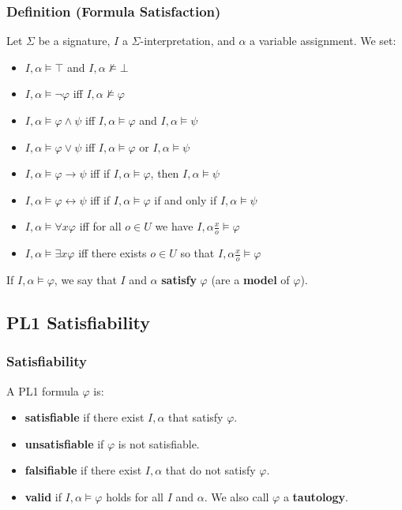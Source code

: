 \documentclass[conference, a4paper]{styles/acmsiggraph}
\begin{document}
        \subsubsection{Definition (Formula Satisfaction)}
            Let $\Sigma$ be a signature, $I$ a $\Sigma$-interpretation, and $\alpha$ a variable assignment. We set:
                \begin{itemize}
                    \item $I, \alpha \vDash \top$ and $I, \alpha \nvDash \bot$
                    \item $I, \alpha \vDash \lnot \varphi$ iff $I, \alpha \nvDash \varphi$
                    \item $I, \alpha \vDash \varphi \wedge \psi$ iff $I, \alpha \vDash \varphi$ and $I, \alpha \vDash \psi$
                    \item $I, \alpha \vDash \varphi \vee \psi$ iff $I, \alpha \vDash \varphi$ or $I, \alpha \vDash \psi$
                    \item $I, \alpha \vDash \varphi \rightarrow \psi$ iff if $I, \alpha \vDash \varphi$, then $I, \alpha \vDash \psi$
                    \item $I, \alpha \vDash \varphi \leftrightarrow \psi$ iff if $I, \alpha \vDash \varphi$ if and only if $I, \alpha \vDash \psi$
                    \item $I, \alpha \vDash \forall x \varphi$ iff for all $o \in U$ we have $I, \alpha \frac{x}{o} \vDash \varphi$
                    \item $I, \alpha \vDash \exists x \varphi$ iff there exists $o \in U$ so that $I, \alpha \frac{x}{o} \vDash \varphi$
                \end{itemize}
            If $I, \alpha \vDash \varphi$, we say that $I$ and $\alpha$ \textbf{satisfy} $\varphi$ (are a \textbf{model} of $\varphi$).
        
    \subsection{PL1 Satisfiability}
        \subsubsection{Satisfiability}
            A PL1 formula $\varphi$ is:
            \begin{itemize}
                \item \textbf{satisfiable} if there exist $I, \alpha$ that satisfy $\varphi$.
                \item \textbf{unsatisfiable} if $\varphi$ is not satisfiable.
                \item \textbf{falsifiable} if there exist $I, \alpha$ that do not satisfy $\varphi$.
                \item \textbf{valid} if $I, \alpha \vDash \varphi$ holds for all $I$ and $\alpha$.
                    We also call $\varphi$ a \textbf{tautology}.
            \end{itemize}
            
\end{document}
